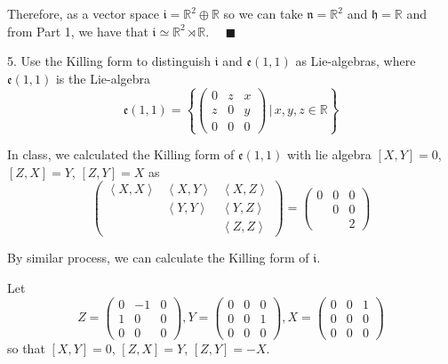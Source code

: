 \documentclass[12pt]{article}
\newcommand{\R}{\mathbb{R}}
\newcommand{\h}{\mathfrak{h}}
\newcommand{\n}{\mathfrak{n}}
\newcommand{\brak}[1]{\left\langle #1 \right\rangle}
\newcommand{\qed}{\quad \blacksquare}
\begin{document}
        Therefore, as a vector space $\mathfrak{i} = \R^2 \oplus \R$ so we can take $\n = \R^2$ and $\h = \R$ and from Part 1, we have that $\mathfrak{i} \simeq \R^2 \rtimes \R$. $\qed$
    \color{black}

       

\pagebreak

5.  Use the Killing form to distinguish $\mathfrak{i}$ and $\mathfrak{e}(1,1)$ as Lie-algebras, where $\mathfrak{e}(1,1)$ is the Lie-algebra 
\[
\mathfrak{e}(1,1) = \left\{ \left( 
\begin{array}{ccc}
0 & z & x \\
z & 0 & y \\
0 & 0 & 0
\end{array}
\right) \, \Bigg| \, x,y,z  \in \R \right\}
\] 

    \color{blue}
        In class, we calculated the Killing form of $\mathfrak{e}(1, 1)$ with lie algebra $[X, Y] = 0$, $[Z, X] = Y$, $[Z, Y] = X$ as 
        \[\begin{pmatrix}
            \brak{X, X} & \brak{X, Y} & \brak{X, Z} \\
            & \brak{Y, Y} & \brak{Y, Z} \\
            & & \brak{Z, Z}
        \end{pmatrix} = \begin{pmatrix}
            0 & 0 & 0 \\
            & 0 & 0 \\
            & & 2
        \end{pmatrix}\]

        By similar process, we can calculate the Killing form of $\mathfrak{i}$. 

        Let
        \[Z = \begin{pmatrix}
            0 & -1 & 0\\ 
            1 & 0 & 0\\
            0 & 0 & 0
        \end{pmatrix}, Y = \begin{pmatrix}
            0 & 0 & 0\\ 
            0 & 0 & 1\\
            0 & 0 & 0
        \end{pmatrix}, X = \begin{pmatrix}
            0 & 0 & 1\\ 
            0 & 0 & 0\\
            0 & 0 & 0
        \end{pmatrix}\] 
        so that $[X, Y] = 0$, $[Z, X] = Y$, $[Z, Y] = -X$. 
\end{document}
